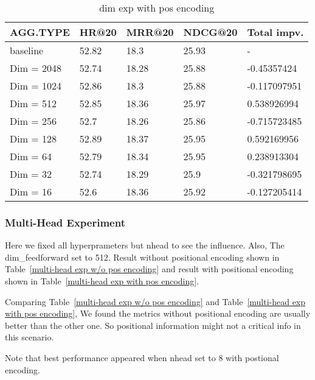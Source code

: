 \documentclass{article}
\begin{document}
\begin{table}
    \caption{dim exp with pos encoding}
    \label{dim exp with pos encoding}
    \centering
    \begin{tabular}{lllll}
        \toprule
        AGG.TYPE   & HR@20 & MRR@20 & NDCG@20 & Total impv.  \\
        \midrule
        baseline   & 52.82 & 18.3   & 25.93   & -            \\
        Dim = 2048 & 52.74 & 18.28  & 25.88   & -0.45357424  \\
        Dim = 1024 & 52.86 & 18.3   & 25.88   & -0.117097951 \\
        Dim = 512  & 52.85 & 18.36  & 25.97   & 0.538926994  \\
        Dim = 256  & 52.7  & 18.26  & 25.86   & -0.715723485 \\
        Dim = 128  & 52.89 & 18.37  & 25.95   & 0.592169956  \\
        Dim = 64   & 52.79 & 18.34  & 25.95   & 0.238913304  \\
        Dim = 32   & 52.74 & 18.29  & 25.9    & -0.321798695 \\
        Dim = 16   & 52.6  & 18.36  & 25.92   & -0.127205414 \\
        \bottomrule
    \end{tabular}
\end{table}

\subsubsection{Multi-Head Experiment}

Here we fixed all hyperprameters but nhead to see the influence.
Also, The dim\_feedforward set to 512.
Result without positional encoding shown in
Table~\ref{multi-head exp w/o pos encoding} and result with
positional encoding shown in Table~\ref{multi-head exp with pos encoding}.

Comparing  Table~\ref{multi-head exp w/o pos encoding} and
Table~\ref{multi-head exp with pos encoding},
We found the metrics without positional encoding are usually
better than the other one.
So positional information might not a critical info in this scenario.

Note that best performance appeared when nhead set to 8 with postional encoding.
\end{document}

